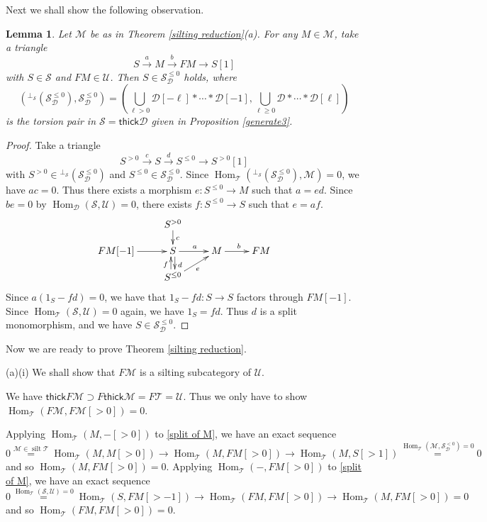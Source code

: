 \documentclass[a4paper,reqno]{amsart}
\newtheorem{lemma}[theorem]{Lemma}
\theoremstyle{definition}
\newcommand{\DD}{{\mathcal D}}
\newcommand{\SSS}{{\mathcal S}}
\newcommand{\UU}{{\mathcal U}}
\newcommand{\TT}{{\mathcal T}}
\newcommand{\MM}{{\mathcal M}}
\newcommand{\thick}{\mathsf{thick}}
\newcommand{\Hom}{\operatorname{Hom}\nolimits}
\newcommand{\silt}{\operatorname{silt}\nolimits}
\begin{document}
Next we shall show the following observation.

\begin{lemma}\label{S in S^le0}
Let $\MM$ be as in Theorem \ref{silting reduction}(a).
For any $M\in\MM$, take a triangle
\begin{equation}\label{split of M}
S\stackrel{a}{\to}M\stackrel{b}{\to}FM\to S[1]
\end{equation}
with $S\in\SSS$ and $FM\in\UU$. 
Then $S\in \SSS^{\leq 0}_{\DD}$ holds, where
\[({}^{\perp_{\SSS}}(\SSS^{\leq 0}_{\DD}),\SSS^{\leq0}_{\DD})
=(\bigcup_{\ell>0}\DD[-\ell]*\cdots*\DD[-1],\bigcup_{\ell\ge0}\DD*\cdots*\DD[\ell])\]
is the torsion pair in $\SSS=\thick\DD$ given in Proposition \ref{generate3}.
\end{lemma}

\begin{proof}
Take a triangle
\[S^{>0}\stackrel{c}{\to}S\stackrel{d}{\to}S^{\le0}\to S^{>0}[1]\]
with $S^{>0}\in {}^{\perp_{\SSS}}(\SSS^{\leq 0}_{\DD})$ and $S^{\le0}\in\SSS^{\leq 0}_{\DD}$.
Since $\Hom_{\TT}({}^{\perp_{\SSS}}(\SSS^{\leq 0}_{\DD}),\MM)=0$, we have $ac=0$.
Thus there exists a morphism $e:S^{\le0}\to M$ such that $a=ed$.
Since $be=0$ by $\Hom_{\DD}(\SSS,\UU)=0$, there exists $f:S^{\le0}\to S$ such that $e=af$.
\[\xymatrix@R=.4cm{
&S^{>0}\ar[d]^c\\
FM[-1]\ar[r]&S\ar[r]^a\ar@<.2em>[d]^d&M\ar[r]^b&FM\\
&S^{\le0}\ar@<.2em>[u]^f\ar[ru]_e
}\]
Since $a(1_S-fd)=0$, we have that $1_S-fd:S\to S$ factors through $FM[-1]$.
Since $\Hom_{\TT}(\SSS,\UU)=0$ again, we have $1_S=fd$.
Thus $d$ is a split monomorphism, and we have $S\in \SSS^{\leq 0}_{\DD}$.
\end{proof}

Now we are ready to prove Theorem \ref{silting reduction}.

(a)(i) We shall show that $F\MM$ is a silting subcategory of $\UU$.

We have $\thick F\MM\supset F\thick\MM=F\TT=\UU$.
Thus we only have to show $\Hom_{\TT}(F\MM,F\MM[>0])=0$.

Applying $\Hom_{\TT}(M,-[>0])$ to \eqref{split of M}, we have an exact sequence
\[0\stackrel{\MM\in\silt\TT}{=}\Hom_{\TT}(M,M[>0])\to\Hom_{\TT}(M,FM[>0])\to\Hom_{\TT}(M,S[>1])\stackrel{\Hom_{\TT}(\MM,\SSS^{<0}_{\DD})=0}{=}0\]
and so $\Hom_{\TT}(M,FM[>0])=0$.
Applying $\Hom_{\TT}(-,FM[>0])$ to \eqref{split of M}, we have an exact sequence
\[0\stackrel{\Hom_{\TT}(\SSS,\UU)=0}{=}\Hom_{\TT}(S,FM[>-1])\to\Hom_{\TT}(FM,FM[>0])\to\Hom_{\TT}(M,FM[>0])=0\]
and so $\Hom_{\TT}(FM,FM[>0])=0$.
\end{document}
